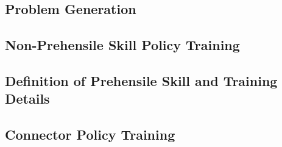 \renewcommand{\thefigure}{A.\Roman{figure}}
\setcounter{figure}{0}
\renewcommand{\thetable}{A.\Roman{table}}
\setcounter{table}{0}

% 

\subsection{Problem Generation}
\label{Appendix:Problem}

\iffalse
\subsection{Set of Domain Regions}
\label{Appendix:region}

% 

\subsection{Skills For Each Domain}\label{Appendix:Skill_each_domain}

\fi

\subsection{Non-Prehensile Skill Policy Training}\label{Appendix:NP_Skill}


\subsection{Definition of Prehensile Skill and Training Details}\label{Appendix:P_Skill}


\subsection{Connector Policy Training}\label{Appendix:Connector}


